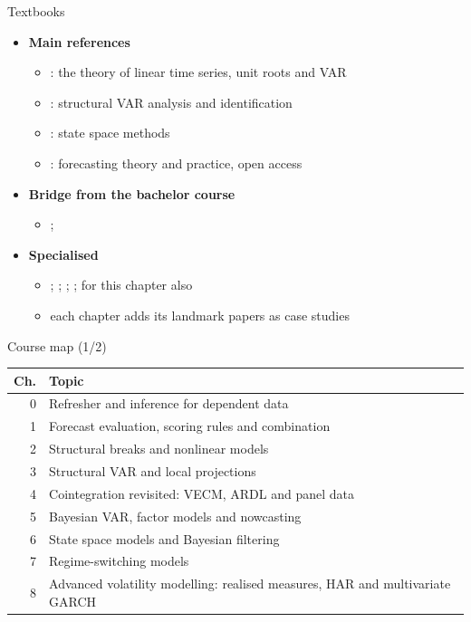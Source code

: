 \begin{frame}{Textbooks}
\itemsize{\small}
\begin{itemize}
    \item \textbf{Main references}
    \begin{itemize}
        \item {}: the theory of linear time series, unit roots and VAR
        \item {}: structural VAR analysis and identification
        \item {}: state space methods
        \item {}: forecasting theory and practice, open access
    \end{itemize}
    \item \textbf{Bridge from the bachelor course}
    \begin{itemize}
        \item {}; 
    \end{itemize}
    \item \textbf{Specialised}
    \begin{itemize}
        \item {}; ; ; ; for this chapter also 
        \item each chapter adds its landmark papers as case studies
    \end{itemize}
\end{itemize}
\end{frame}

\begin{frame}{Course map (1/2)}
\begin{center}
\footnotesize
\begin{tabular}{rl}
\toprule
\textbf{Ch.} & \textbf{Topic} \\
\midrule
0 & Refresher and inference for dependent data \\
1 & Forecast evaluation, scoring rules and combination \\
2 & Structural breaks and nonlinear models \\
3 & Structural VAR and local projections \\
4 & Cointegration revisited: VECM, ARDL and panel data \\
5 & Bayesian VAR, factor models and nowcasting \\
6 & State space models and Bayesian filtering \\
7 & Regime-switching models \\
8 & Advanced volatility modelling: realised measures, HAR and multivariate GARCH \\
\bottomrule
\end{tabular}
\end{center}
\end{frame}

